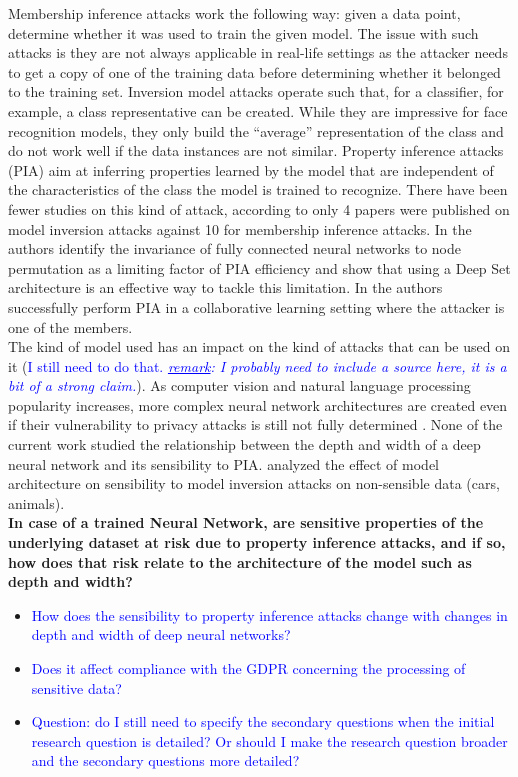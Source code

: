 \documentclass[11pt]{article}
\begin{document}
Membership inference attacks work the following way: given a data point, determine whether it was used to train the given model. The issue with such attacks is they are not always applicable in real-life settings as the attacker needs to get a copy of one of the training data before determining whether it belonged to the training set. Inversion model attacks operate such that, for a classifier, for example, a class representative can be created. While they are impressive for face recognition models, they only build the “average” representation of the class and do not work well if the data instances are not similar.
Property inference attacks (PIA) aim at inferring properties learned by the model that are independent of the characteristics of the class the model is trained to recognize. There have been fewer studies on this kind of attack, according to \citet{He2019} only 4 papers were published on model inversion attacks against 10 for membership inference attacks. In \cite{Ganju2018} the authors identify the invariance of fully connected neural networks to node permutation as a limiting factor of PIA efficiency and show that using a Deep Set architecture \cite{zaheer2017deep} is an effective way to tackle this limitation. In \cite{Melis2019} the authors successfully perform PIA in a collaborative learning setting where the attacker is one of the members.\\

The kind of model used has an impact on the kind of attacks that can be used on it (\textcolor{blue}{I still need to do that. \textit{\underline{remark}: I probably need to include a source here, it is a bit of a strong claim.}}). As computer vision and natural language processing popularity increases, more complex neural network architectures are created even if their vulnerability to privacy attacks is still not fully determined \cite{He2019}. None of the current work studied the relationship between the depth and width of a deep neural network and its sensibility to PIA. \citet{Geiping2020} analyzed the effect of model architecture on sensibility to model inversion attacks on non-sensible data (cars, animals).\\


\textbf{In case of a trained Neural Network, are sensitive properties of the underlying dataset at risk due to property inference attacks, and if so, how does that risk relate to the architecture of the model such as depth and width?}
\begin{itemize}
\item{\textcolor{blue}{How does the sensibility to property inference attacks change with changes in depth and width of deep neural networks?}}
\item{\textcolor{blue}{Does it affect compliance with the GDPR concerning the processing of sensitive data?}}
\item{\textcolor{blue}{Question: do I still need to specify the secondary questions when the initial research question is detailed? Or should I make the research question broader and the secondary questions more detailed?}}
\end{itemize}
\end{document}
